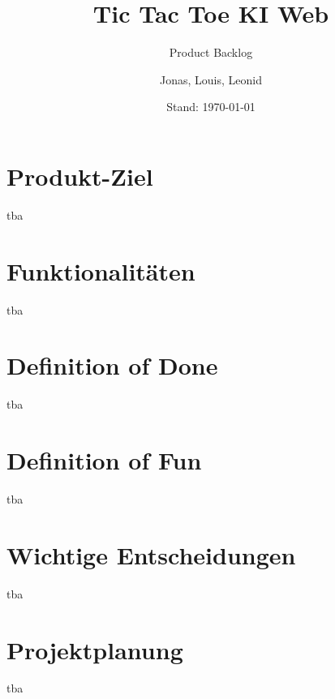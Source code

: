 \documentclass[titlepage]{scrartcl}
\title{Tic Tac Toe KI Web}
\subtitle{Product Backlog}
\date{Stand: \today}
\author{Jonas, Louis, Leonid}
\begin{document}
\maketitle

\section{Produkt-Ziel}
tba
\section{Funktionalitäten}
tba
\section{Definition of Done}
tba
\section{Definition of Fun}
tba
\section{Wichtige Entscheidungen}
tba
\section{Projektplanung}
tba
\end{document}
